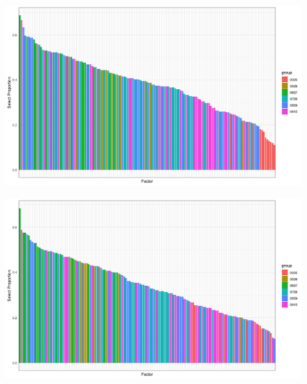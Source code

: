 \begin{landscape}
	\begin{figure}[ht]
		\includegraphics[scale = 0.65]{en_plot}
		\centering
	\end{figure}
\end{landscape}

\begin{landscape}
	\begin{figure}[ht]
		\includegraphics[scale = 0.65]{lasso_plot}
		\centering
	\end{figure}
\end{landscape}



%